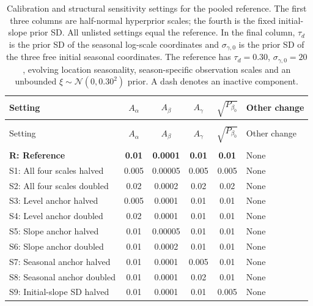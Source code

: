 \documentclass[11pt,a4paper]{article}
\newcommand{\N}{\mathcal N}
\begin{document}
\begingroup
	\small
	\setlength{\tabcolsep}{3pt}
	\renewcommand{\arraystretch}{1.18}
	\begin{longtable}{@{}>{\raggedright\arraybackslash}p{3.25cm}cccc>{\raggedright\arraybackslash}p{5.1cm}@{}}
		\caption{Calibration and structural sensitivity settings for the pooled
reference. The first three columns are half-normal hyperprior scales;
the fourth is the fixed initial-slope prior SD. All unlisted settings
equal the reference. In the final column, \(\tau_d\) is the prior SD of the seasonal
			log-scale coordinates and \(\sigma_{\gamma,0}\) is the prior SD of the
			three free initial seasonal coordinates. The reference has
			\(\tau_d=0.30\), \(\sigma_{\gamma,0}=20\), evolving location seasonality,
			season-specific observation scales and an unbounded
			\(\xi\sim\N(0,0.30^2)\) prior. A dash denotes an inactive component.}
		\label{tab:sensitivity-settings}\\
		\toprule
		Setting & \(A_\alpha\) & \(A_\beta\) & \(A_\gamma\) & \(\sqrt{P_{\beta_0}}\) & Other change \\
		\midrule
		\endfirsthead
		\multicolumn{6}{l}{\tablename\ \thetable\ (continued)}\\
		\toprule
		Setting & \(A_\alpha\) & \(A_\beta\) & \(A_\gamma\) & \(\sqrt{P_{\beta_0}}\) & Other change \\
		\midrule
		\endhead
		\midrule
		\multicolumn{6}{r}{Continued on the next page}\\
		\endfoot
		\bottomrule
		\endlastfoot
		\textbf{R: Reference} & \textbf{0.01} & \textbf{0.0001} & \textbf{0.01} & \textbf{0.01} & None \\
		\addlinespace
		S1: All four scales halved & 0.005 & 0.00005 & 0.005 & 0.005 & None \\
		S2: All four scales doubled & 0.02 & 0.0002 & 0.02 & 0.02 & None \\
		S3: Level anchor halved & 0.005 & 0.0001 & 0.01 & 0.01 & None \\
		S4: Level anchor doubled & 0.02 & 0.0001 & 0.01 & 0.01 & None \\
		S5: Slope anchor halved & 0.01 & 0.00005 & 0.01 & 0.01 & None \\
		S6: Slope anchor doubled & 0.01 & 0.0002 & 0.01 & 0.01 & None \\
		S7: Seasonal anchor halved & 0.01 & 0.0001 & 0.005 & 0.01 & None \\
		S8: Seasonal anchor doubled & 0.01 & 0.0001 & 0.02 & 0.01 & None \\
		S9: Initial-slope SD halved & 0.01 & 0.0001 & 0.01 & 0.005 & None \\

\end{longtable}
\end{document}
